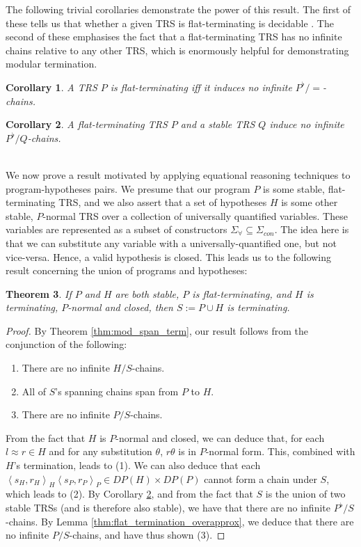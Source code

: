 \documentclass{article}
\newtheorem{theorem}{Theorem}%
\newtheorem{corollary}[theorem]{Corollary}
\theoremstyle{definition}
\newcommand{\dpair}[2]{\left\langle #1, #2 \right\rangle}
\begin{document}
The following trivial corollaries demonstrate the power of this result. The first of these tells us that whether a given TRS is flat-terminating is decidable \cite{arts2000dependency}. The second of these emphasises the fact that a flat-terminating TRS has no infinite chains relative to any other TRS, which is enormously helpful for demonstrating modular termination.  
\begin{corollary} \label{thm:flat_chain_equality}
    A TRS $P$ is flat-terminating iff it induces no infinite $P^\flat/\!\!=$-chains.  
\end{corollary}
\begin{corollary} \label{thm:flat_term_stable}
    A flat-terminating TRS $P$ and a stable TRS $Q$ induce no infinite $P^\flat/Q$-chains.
\end{corollary}
~\\
We now prove a result motivated by applying equational reasoning techniques to program-hypotheses pairs. We presume that our program $P$ is some stable, flat-terminating TRS, and we also assert that a set of hypotheses $H$ is some other stable, $P$-normal TRS over a collection of universally quantified variables. These variables are represented as a subset of constructors $\Sigma_\forall \subseteq \Sigma_{con}$. The idea here is that we can substitute any variable with a universally-quantified one, but not vice-versa. Hence, a valid hypothesis is closed. This leads us to the following result concerning the union of programs and hypotheses:
\begin{theorem}
    If $P$ and $H$ are both stable, $P$ is flat-terminating, and $H$ is terminating, $P$-normal and closed, then $S := P \cup H$ is terminating.
\end{theorem}

\begin{proof}
    By Theorem \ref{thm:mod_span_term}, our result follows from the conjunction of the following: \begin{enumerate}
        \item There are no infinite $H/S$-chains.
        \item All of $S$'s spanning chains span from $P$ to $H$.
        \item There are no infinite $P/S$-chains.
    \end{enumerate}
    From the fact that $H$ is $P$-normal and closed, we can deduce that, for each $l \approx r \in H$ and for any substitution $\theta$, $r\theta$ is in $P$-normal form. This, combined with $H$'s termination, leads to (1). We can also deduce that each $\dpair{s_H}{r_H}_H \dpair{s_P}{r_P}_P \in DP(H) \times DP(P)$ cannot form a chain under $S$, which leads to (2). By Corollary \ref{thm:flat_term_stable}, and from the fact that $S$ is the union of two stable TRSs (and is therefore also stable), we have that there are no infinite $P^\flat/S$-chains. By Lemma \ref{thm:flat_termination_overapprox}, we deduce that there are no infinite $P/S$-chains, and have thus shown (3). 
\end{proof}
\end{document}
